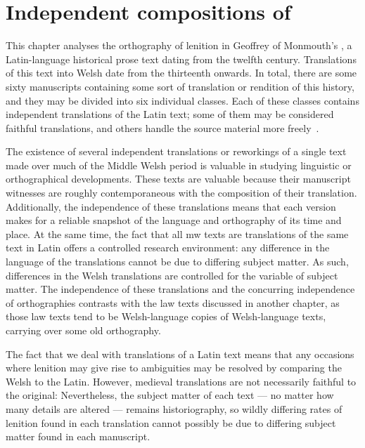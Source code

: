 \chapter{Independent compositions of }
This chapter analyses the orthography of lenition in Geoffrey of Monmouth's , a Latin-language historical prose text dating from the twelfth century.
Translations of this text into Welsh date from the thirteenth onwards.
In total, there are some sixty manuscripts containing some sort of translation or rendition of this history, and they may be divided into six individual classes.
Each of these classes contains independent translations of the Latin text; some of them may be considered faithful translations, and others handle the source material more freely~\autocite[xxiv-xxxi]{roberts_brut_1971}.

The existence of several independent translations or reworkings of a single text made over much of the Middle Welsh period is valuable in studying linguistic or orthographical developments.
These texts are valuable because their manuscript witnesses are roughly contemporaneous with the composition of their translation.
Additionally, the independence of these translations means that each version makes for a reliable snapshot of the language and orthography of its time and place.
At the same time, the fact that all \gls{mw} texts are translations of the same text in Latin offers a controlled research environment:  any difference in the language of the translations cannot be due to differing subject matter.
As such, differences in the Welsh translations are controlled for the variable of subject matter.
The independence of these translations and the concurring independence of orthographies contrasts with the law texts discussed in another chapter, as those law texts tend to be Welsh-language copies of Welsh-language texts, carrying over some old orthography.

The fact that we deal with translations of a Latin text means that any occasions where lenition may give rise to ambiguities may be resolved by comparing the Welsh to the Latin.
However, medieval translations are not necessarily faithful to the original:
Nevertheless, the subject matter of each text --- no matter how many details are altered --- remains historiography, so wildly differing rates of lenition found in each translation cannot possibly be due to differing subject matter found in each manuscript.

